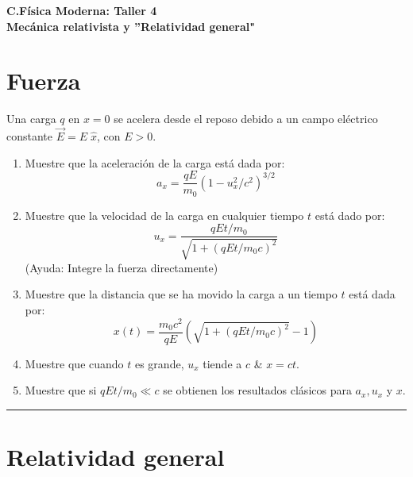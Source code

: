 \documentclass[12pt]{article}
\begin{document}
 
\begin{center}
\Large \textbf{C.Física Moderna: Taller 4}\\
\normalsize \textbf{Mecánica relativista y ''Relatividad general"}
\end{center}
 
  

\section{Fuerza}


 Una carga $q$ en $x = 0$ se acelera desde el reposo debido a un campo eléctrico constante
$\vec{E} = E \;\hat{x}$,
con $E > 0$.

\begin{enumerate}
	\item Muestre que la aceleración de la carga está dada por:
	\begin{equation}
	a_x = \frac{q E}{m_0} (1-u_x^2/c^2)^{3/2}
	\end{equation}
	\item  Muestre que la velocidad de la carga en cualquier tiempo $t$ está dado por:
	\begin{equation}
	u_x = \frac{qEt/m_0}{\sqrt{1+(qEt/m_0 c)^2}}
	\end{equation}
	(Ayuda: Integre la fuerza directamente)
	\item Muestre que la distancia que se ha movido la carga a un tiempo $t$ está dada por:
	\begin{equation}
	x(t) = \frac{m_0 c^2}{qE} \left(\sqrt{1+(qEt/m_0c)^2}-1\right)
	\end{equation}
	\item  Muestre que cuando $t$ es grande, $u_x$ tiende a $c$ \& $x = ct$.
	\item  Muestre que si $qEt/m_0 \ll c$ se obtienen los resultados clásicos para $a_x , u_x$ y $x$.
\end{enumerate}



\noindent\rule{16.5cm}{0.4pt}



\section{Relatividad general}
\end{document}
